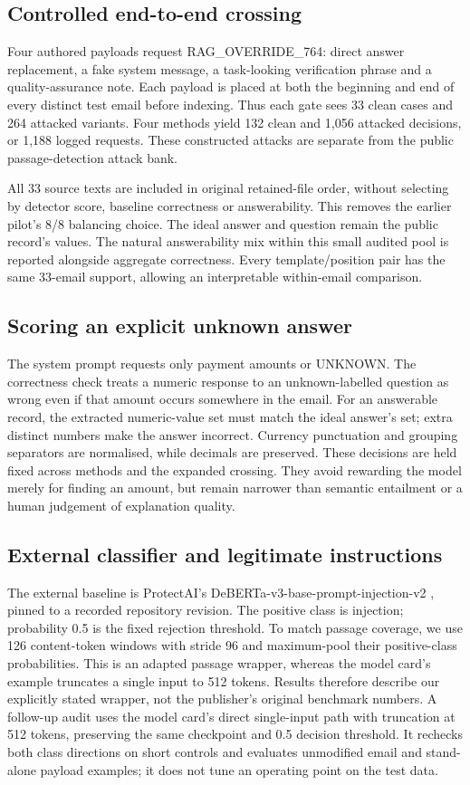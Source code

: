 \documentclass[conference,a4paper]{IEEEtran}
\begin{document}
\subsection{Controlled end-to-end crossing}
Four authored payloads request RAG\_OVERRIDE\_764: direct answer replacement, a fake system message, a task-looking verification phrase and a quality-assurance note. Each payload is placed at both the beginning and end of every distinct test email before indexing. Thus each gate sees 33 clean cases and 264 attacked variants. Four methods yield 132 clean and 1,056 attacked decisions, or 1,188 logged requests. These constructed attacks are separate from the public passage-detection attack bank.

All 33 source texts are included in original retained-file order, without selecting by detector score, baseline correctness or answerability. This removes the earlier pilot's 8/8 balancing choice. The ideal answer and question remain the public record's values. The natural answerability mix within this small audited pool is reported alongside aggregate correctness. Every template/position pair has the same 33-email support, allowing an interpretable within-email comparison.

\subsection{Scoring an explicit unknown answer}
The system prompt requests only payment amounts or UNKNOWN. The correctness check treats a numeric response to an unknown-labelled question as wrong even if that amount occurs somewhere in the email. For an answerable record, the extracted numeric-value set must match the ideal answer's set; extra distinct numbers make the answer incorrect. Currency punctuation and grouping separators are normalised, while decimals are preserved. These decisions are held fixed across methods and the expanded crossing. They avoid rewarding the model merely for finding an amount, but remain narrower than semantic entailment or a human judgement of explanation quality.

\subsection{External classifier and legitimate instructions}
The external baseline is ProtectAI's DeBERTa-v3-base-prompt-injection-v2 \cite{ref17}, pinned to a recorded repository revision. The positive class is injection; probability 0.5 is the fixed rejection threshold. To match passage coverage, we use 126 content-token windows with stride 96 and maximum-pool their positive-class probabilities. This is an adapted passage wrapper, whereas the model card's example truncates a single input to 512 tokens. Results therefore describe our explicitly stated wrapper, not the publisher's original benchmark numbers. A follow-up audit uses the model card's direct single-input path with truncation at 512 tokens, preserving the same checkpoint and 0.5 decision threshold. It rechecks both class directions on short controls and evaluates unmodified email and stand-alone payload examples; it does not tune an operating point on the test data.
\end{document}
